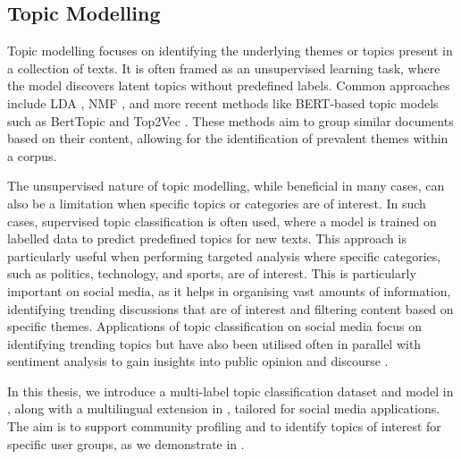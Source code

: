 \subsection{Topic Modelling}
Topic modelling focuses on identifying the underlying themes or topics present in a collection of texts. It is often framed as an unsupervised learning task, where the model discovers latent topics without predefined labels. Common approaches include \ac{LDA} \cite{lda}, \ac{NMF} \cite{lee1999learning}, and more recent methods like BERT-based topic models such as BertTopic \cite{bertopic} and Top2Vec \cite{angelov2020top2vec}. These methods aim to group similar documents based on their content, allowing for the identification of prevalent themes within a corpus.

The unsupervised nature of topic modelling, while beneficial in many cases, can also be a limitation when specific topics or categories are of interest. In such cases, supervised topic classification is often used, where a model is trained on labelled data to predict predefined topics for new texts. This approach is particularly useful when performing targeted analysis where specific categories, such as politics, technology, and sports, are of interest. This is particularly important on social media, as it helps in organising vast amounts of information, identifying trending discussions that are of interest and filtering content based on specific themes. Applications of topic classification on social media focus on identifying trending topics \cite{lee2011twitter,bouadjenek2022longitudinal} but have also been utilised often in parallel with sentiment analysis to gain insights into public opinion and discourse \cite{huang2013sentiment,rodrigues2022new}.

In this thesis, we introduce a multi-label topic classification dataset and model in , along with a multilingual extension in , tailored for social media applications. The aim is to support community profiling and to identify topics of interest for specific user groups, as we demonstrate in .


